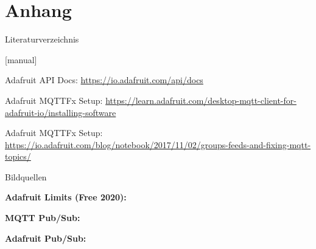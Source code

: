 \section{Anhang}

\begin{frame}{Literaturverzeichnis}
    \begin{thebibliography}{Längste Bezeichnung}
        [manual]
           
           
            \newblock Adafruit API Docs: \url{https://io.adafruit.com/api/docs}
           
            \newblock Adafruit MQTTFx Setup: \url{https://learn.adafruit.com/desktop-mqtt-client-for-adafruit-io/installing-software}
           
            \newblock Adafruit MQTTFx Setup: \url{https://io.adafruit.com/blog/notebook/2017/11/02/groups-feeds-and-fixing-mqtt-topics/}
           
           
    \end{thebibliography}
\end{frame}

{
    \tiny
    \begin{frame}{Bildquellen}
    
          \textbf{Adafruit Limits (Free 2020):} \\
           \medskip
        
           \textbf{MQTT Pub/Sub:} \\
           \medskip
           
            \textbf{Adafruit Pub/Sub:} \\
           \medskip
        
        
        
        \end{frame}
}
